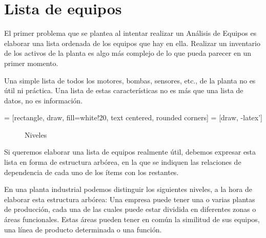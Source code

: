 \documentclass[../main]{subfiles}
\begin{document}
\section{Lista de equipos}

El primer problema que se plantea al intentar realizar un Análisis de
Equipos es elaborar una lista ordenada de los equipos que hay en ella.
Realizar un inventario de los activos de la planta es algo más complejo 
de lo que pueda parecer en un primer momento.

Una simple lista de todos los motores, bombas, sensores, etc., de la planta no es útil ni práctica.
Una lista de estas características no es más que una
lista de datos, no es información.


 = [rectangle, draw, fill=white!20, text centered, rounded corners]
 = [draw, -latex']

\begin{figure}[h]
    \centering
    
    \caption{Niveles}
    \label{fig:my_label}
\end{figure}

Si queremos elaborar una lista de equipos
realmente útil, debemos expresar esta lista en forma de estructura arbórea, en
la que se indiquen las relaciones de dependencia de cada uno de los ítems con
los restantes.

En una planta industrial podemos distinguir los siguientes niveles, a la
hora de elaborar esta estructura arbórea:
Una empresa puede tener una o varias plantas de producción, cada una de
las cuales puede estar dividida en diferentes zonas o áreas funcionales. Estas
áreas pueden tener en común la similitud de sus equipos, una línea de producto 
determinada o una función. 
\end{document}
